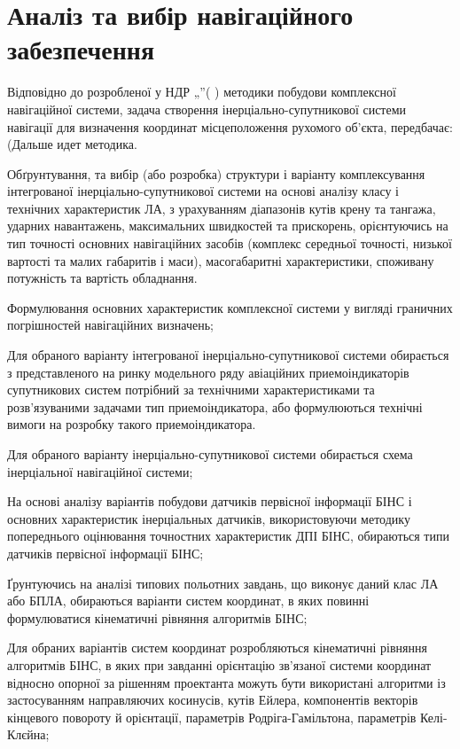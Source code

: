 \section{Аналіз та вибір навігаційного забезпечення}

Відповідно до розробленої у НДР „”( ) методики 
побудови комплексної навігаційної системи, задача створення 
інерціально-супутникової системи навігації для визначення координат 
місцеположення рухомого об'єкта, передбачає: (Дальше идет методика. 





Обґрунтування, та вибір (або розробка) структури і варіанту комплексування 
інтегрованої інерціально-супутникової системи на основі аналізу класу і 
технічних характеристик ЛА, з урахуванням діапазонів кутів крену та тангажа, 
ударних навантажень, максимальних швидкостей та прискорень, орієнтуючись на 
тип точності основних навігаційних засобів (комплекс середньої точності, 
низької вартості та малих габаритів і маси), масогабаритні характеристики, 
споживану потужність та вартість обладнання. 

Формулювання основних характеристик комплексної системи у вигляді граничних 
погрішностей навігаційних визначень;

Для обраного варіанту інтегрованої інерціально-супутникової системи 
обирається з представленого на ринку модельного ряду авіаційних 
приемоіндикаторів супутникових систем потрібний за технічними 
характеристиками та розв'язуваними задачами тип приемоіндикатора, або 
формулюються технічні вимоги  на розробку такого приемоіндикатора. 

Для обраного варіанту інерціально-супутникової системи обирається схема 
інерціальної навігаційної системи;

На основі аналізу варіантів побудови датчиків первісної інформації БІНС
і основних характеристик інерціальных датчиків, використовуючи методику 
попереднього оцінювання точностних характеристик ДПІ 
БІНС, обираються типи датчиків первісної інформації БІНС;

Ґрунтуючись на аналізі типових польотних завдань, що виконує даний клас ЛА
або БПЛА, обираються варіанти систем координат, в яких повинні формулюватися 
кінематичні рівняння алгоритмів БІНС;

Для обраних варіантів систем координат розробляються кінематичні рівняння 
алгоритмів БІНС, в яких при завданні орієнтацію зв'язаної системи координат 
відносно опорної за рішенням проектанта можуть бути використані алгоритми 
із застосуванням направляючих косинусів, кутів Ейлера, компонентів векторів 
кінцевого повороту й орієнтації, параметрів Родріга-Гамільтона, параметрів 
Келі-Клєйна;


